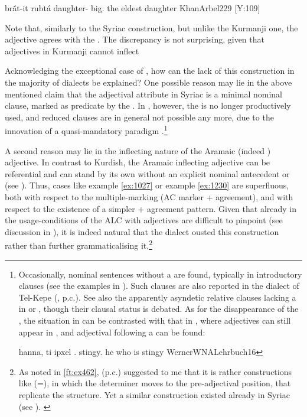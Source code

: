 {brā́t-it rubtá}
{daughter-\cst{} big.\fem}
{the eldest daughter} 
{KhanArbel}{229 {[Y:109]}}
 
 Note that, similarly to the Syriac construction, but unlike the Kurmanji one, the adjective agrees with the . The discrepancy is not surprising, given that adjectives in Kurmanji cannot inflect
 
 Acknowledging the exceptional case of \JArb, how can the lack of this construction in the majority of dialects be explained?  One possible reason may lie in the above mentioned claim that  the adjectival attribute in Syriac is a minimal nominal clause, marked as predicate by the . In , however, the  is no longer productively used, and reduced clauses are in general not possible any more, due to the innovation of a quasi-mandatory  paradigm \citep{GoldenbergPronouns, GoldenbergEarly}.\footnote{Occasionally, nominal sentences without a  are found, typically in introductory clauses (see the \Diy examples in \cite[315, \S 13.3]{NapiorkowskaDiyana}). Such clauses are also reported in the dialect of Tel-Kepe (, p.c.). See also the apparently asyndetic relative clauses lacking a  in \JZax {} or \Qar {}, though their clausal status is debated. As for the disappearance of the \abs*, the situation in  can be contrasted with that in \WNA, where adjectives  can still appear in \abs* \citep[363]{WernerWNA}, and adjectival \secns following a \lnk* can be found: 
  
  {hanna, ti ipxel}
  {\dem.\masc{} \lnk{} stingy.\abs{}}
  {he who is stingy}
  {WernerWNALehrbuch}{16}
 
   }
  
   
  
  A second reason may lie in the inflecting nature of the Aramaic (indeed ) adjective. In contrast to Kurdish, the Aramaic inflecting adjective can be referential and can stand by its own without an explicit nominal antecedent or \lnk* (see \Syr {}). Thus, cases like \Syr example \ref{ex:1027} or \Arb example \ref{ex:1230} are superfluous, both with respect to the multiple-marking (AC marker + agreement), and with respect to the existence of a simpler  + agreement pattern. Given that already in \Syr the usage-conditions of the ALC with adjectives are difficult to pinpoint (see discussion in ), it is indeed natural that the  dialect ousted this construction rather than further grammaticalising it.\footnote{As noted in \vref{ft:ex462},  (p.c.) suggested to me that it is rather constructions like  (=), in which the determiner moves to the pre-adjectival position, that replicate the \Kur structure. Yet  a similar construction existed already in Syriac (see ). \label{ft:ez_adj}}
  
